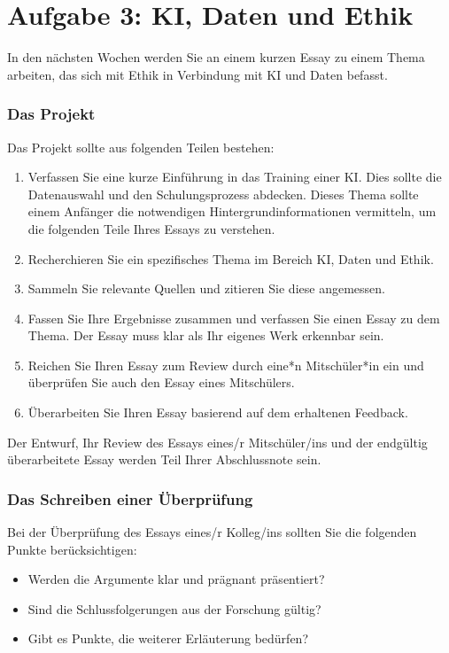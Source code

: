 \documentclass[12pt,a4paper]{report}
\begin{document}
\newpage

\section*{Aufgabe 3: KI, Daten und Ethik}
In den nächsten Wochen werden Sie an einem kurzen Essay zu einem Thema arbeiten, das sich mit Ethik in Verbindung mit KI und Daten befasst.

\subsubsection*{Das Projekt}
Das Projekt sollte aus folgenden Teilen bestehen:

\begin{enumerate}
\item Verfassen Sie eine kurze Einführung in das Training einer KI. Dies sollte die Datenauswahl und den Schulungsprozess abdecken. Dieses Thema sollte einem Anfänger die notwendigen Hintergrundinformationen vermitteln, um die folgenden Teile Ihres Essays zu verstehen.
\item Recherchieren Sie ein spezifisches Thema im Bereich KI, Daten und Ethik.
\item Sammeln Sie relevante Quellen und zitieren Sie diese angemessen.
\item Fassen Sie Ihre Ergebnisse zusammen und verfassen Sie einen Essay zu dem Thema. Der Essay muss klar als Ihr eigenes Werk erkennbar sein.
\item Reichen Sie Ihren Essay zum Review durch eine*n Mitschüler*in ein und überprüfen Sie auch den Essay eines Mitschülers.
\item Überarbeiten Sie Ihren Essay basierend auf dem erhaltenen Feedback.
\end{enumerate}

Der Entwurf, Ihr Review des Essays eines/r Mitschüler/ins und der endgültig überarbeitete Essay werden Teil Ihrer Abschlussnote sein.

\subsubsection*{Das Schreiben einer Überprüfung}
Bei der Überprüfung des Essays eines/r Kolleg/ins sollten Sie die folgenden Punkte berücksichtigen:

\begin{itemize}
\item Werden die Argumente klar und prägnant präsentiert?
\item Sind die Schlussfolgerungen aus der Forschung gültig?
\item Gibt es Punkte, die weiterer Erläuterung bedürfen?
\end{itemize}
\end{document}
